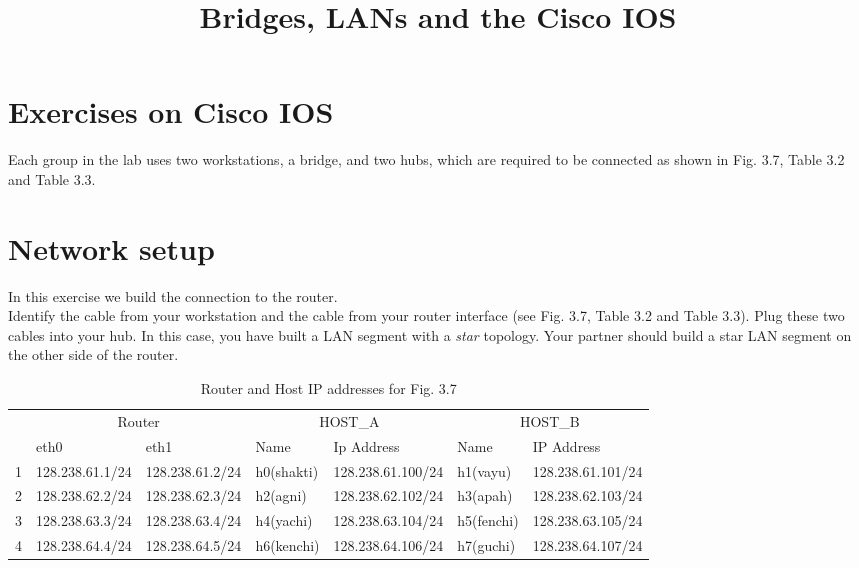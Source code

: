 \documentclass{../UTNetLab}
\title{Bridges, LANs and the Cisco IOS}
\author{%
    Dr. Ahmad Khonsari - \FR{دکتر احمد خونساری}\\
    \href{mailto:a_khonsari@ut.ac.ir}{a\_khonsari@ut.ac.ir}\\
    \vskip 1.5em%
    Amir Haji Ali Khamseh'i - \FR{امیر حاجی‌علی‌خمسه‌ء}\\
    \href{mailto:khamse@ut.ac.ir}{khamse@ut.ac.ir}\\
    \vskip 1.5em%
    \href{mailto:m.borhani@ut.ac.ir}{Muhammad Borhani} - \FR{محمد برهانی}\\
    \href{mailto:a.a.khordadi@ut.ac.ir}{Amirahmad Khordadi} - \FR{امیراحمد خردادی}\\
    \href{mailto:sina\_kashipazha@ut.ac.ir}{Sina Kashi pazha} - \FR{سینا کاشی‌پزها}
}
\begin{document}
    \maketitle

\section*{Exercises on Cisco IOS}
    Each group in the lab uses two workstations, a bridge, and two hubs, which are required to be connected as shown in Fig. 3.7, Table 3.2 and Table 3.3.

\section{Network setup}
    In this exercise we build the connection to the router. \\
    Identify the cable from your workstation and the cable from your router interface (see Fig. 3.7, Table 3.2 and Table 3.3).
    Plug these two cables into your hub.
    In this case, you have built a LAN segment with a \textit{star} topology.
    Your partner should build a star LAN segment on the other side of the router. \\
    \begin{table}[H]
        \caption{Router and Host IP addresses for Fig. 3.7}
        \vspace{5pt}
        \centering
        \large
        \begin{tabular}{ *7l }
            \hline \hline
                & \multicolumn{2}{c}{Router} & \multicolumn{2}{c}{HOST\_A} & \multicolumn{2}{c}{HOST\_B} \\
            & eth0 & eth1 & Name & Ip Address & Name & IP Address \\
            \hline 
            1 & 128.238.61.1/24 & 128.238.61.2/24 & h0(shakti) & 128.238.61.100/24 & h1(vayu) & 128.238.61.101/24 \\
            2 & 128.238.62.2/24 & 128.238.62.3/24 & h2(agni) & 128.238.62.102/24 & h3(apah) & 128.238.62.103/24 \\
            3 & 128.238.63.3/24 & 128.238.63.4/24 & h4(yachi) & 128.238.63.104/24 & h5(fenchi) & 128.238.63.105/24 \\
            4 & 128.238.64.4/24 & 128.238.64.5/24 & h6(kenchi) & 128.238.64.106/24 & h7(guchi) & 128.238.64.107/24 \\
            \hline \hline
            \end{tabular}
    \end{table}
\end{document}
